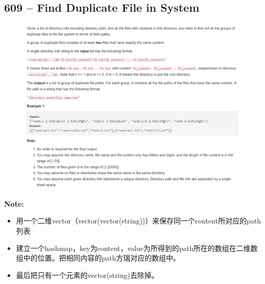 \documentclass[a4paper,12pt]{article}
\begin{document}
\subsection{609 -- Find Duplicate File in System}
\begin{figure}[H]
	\begin{center}
		\includegraphics[width=15cm]{609.png}
	\end{center}
\end{figure}
\textbf{\large{Note:}}
\par
\vspace{0.5em}
\noindent
\begin{CJK*}{UTF8}{gbsn}
	\begin{itemize}
		\item 用一个二维vector（vector(vector(string))）来保存同一个content所对应的path列表
		\item 建立一个hashmap，key为content，value为所得到的path所在的数组在二维数组中的位置。把相同内容的path方瑞对应的数组中。
		\item 最后把只有一个元素的vector(string)去除掉。
	\end{itemize}
\clearpage
\end{CJK*}
\end{document}
